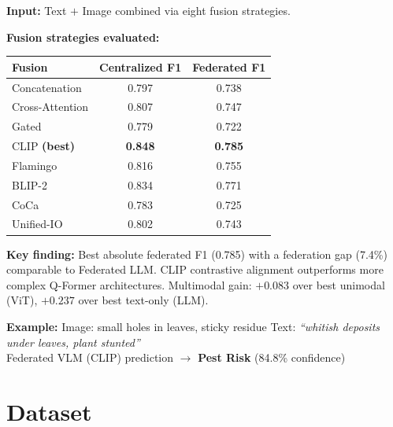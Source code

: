 \documentclass[11pt,a4paper]{article}
\begin{document}
\begin{paradigmbox}[linecolor=vlmred]
\noindent{\large\bfseries\textcolor{vlmred}{Paradigm 3 --- Federated VLM}}
\smallskip

\noindent\textbf{Input:} Text $+$ Image combined via eight fusion strategies.

\noindent\textbf{Fusion strategies evaluated:}

\smallskip
\begin{center}
\renewcommand{\arraystretch}{1.3}
\begin{tabular}{lcc}
\toprule
\textbf{Fusion} & \textbf{Centralized F1} & \textbf{Federated F1} \\
\midrule
Concatenation & 0.797 & 0.738 \\
Cross-Attention & 0.807 & 0.747 \\
Gated & 0.779 & 0.722 \\
\rowcolor{vlmlight}
CLIP \textbf{(best)} & \textbf{0.848} & \textbf{0.785} \\
Flamingo & 0.816 & 0.755 \\
BLIP-2 & 0.834 & 0.771 \\
CoCa & 0.783 & 0.725 \\
Unified-IO & 0.802 & 0.743 \\
\bottomrule
\end{tabular}
\end{center}

\noindent\textbf{Key finding:} Best absolute federated F1 (0.785) with a federation gap (7.4\%)
comparable to Federated LLM.
CLIP contrastive alignment outperforms more complex Q-Former architectures.
Multimodal gain: $+0.083$ over best unimodal (ViT), $+0.237$ over best text-only (LLM).

\begin{examplebox}
\textbf{Example:}\enspace
Image: small holes in leaves, sticky residue \quad
Text: \textit{``whitish deposits under leaves, plant stunted''} \\
Federated VLM (CLIP) prediction $\to$ \textbf{Pest Risk} \hfill (84.8\% confidence)
\end{examplebox}
\end{paradigmbox}

\section{Dataset}
\end{document}
